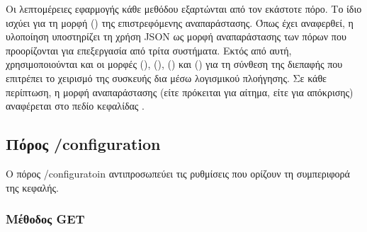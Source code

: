 Οι λεπτομέρειες εφαρμογής κάθε μεθόδου εξαρτώνται από τον εκάστοτε πόρο. Το ίδιο
ισχύει για τη μορφή () της επιστρεφόμενης αναπαράστασης. Όπως
έχει αναφερθεί, η υλοποίηση υποστηρίζει τη χρήση JSON ως μορφή αναπαράστασης των
πόρων που προορίζονται για επεξεργασία από τρίτα συστήματα. Εκτός από αυτή,
χρησιμοποιούνται και οι μορφές (), (),
() και () για τη σύνθεση της
διεπαφής που επιτρέπει το χειρισμό της συσκευής δια μέσω λογισμικού πλοήγησης.
Σε κάθε περίπτωση, η μορφή αναπαράστασης (είτε πρόκειται για αίτημα, είτε για
απόκρισης) αναφέρεται στο πεδίο κεφαλίδας 
\parencite[124]{rfc2616}.


\subsection{Πόρος /configuration}
\label{subsec:network:config}

Ο πόρος /configuratoin αντιπροσωπεύει τις ρυθμίσεις που ορίζουν τη συμπεριφορά
της κεφαλής.


\subsubsection{Μέθοδος GET}
\label{ssubsec:network:config-get}


